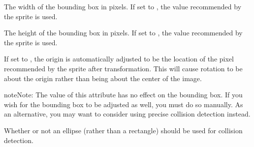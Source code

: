 \documentclass[letterpaper,10pt,english]{sphinxmanual}
\begin{document}
\begin{fulllineitems}
\begin{fulllineitems}
\end{fulllineitems}


\begin{fulllineitems}
\label{dsp:sge.dsp.Object.bbox_width}
The width of the bounding box in pixels.  If set to
, the value recommended by the sprite is used.

\end{fulllineitems}


\begin{fulllineitems}
\label{dsp:sge.dsp.Object.bbox_height}
The height of the bounding box in pixels.  If set to
, the value recommended by the sprite is used.

\end{fulllineitems}


\begin{fulllineitems}
\label{dsp:sge.dsp.Object.regulate_origin}
If set to , the origin is automatically adjusted to
be the location of the pixel recommended by the sprite after
transformation.  This will cause rotation to be about the origin
rather than being about the center of the image.

\begin{notice}{note}{Note:}
The value of this attribute has no effect on the bounding box.
If you wish for the bounding box to be adjusted as well, you
must do so manually.  As an alternative, you may want to
consider using precise collision detection instead.
\end{notice}

\end{fulllineitems}


\begin{fulllineitems}
\label{dsp:sge.dsp.Object.collision_ellipse}
Whether or not an ellipse (rather than a rectangle) should be
used for collision detection.

\end{fulllineitems}



\end{fulllineitems}
\end{document}
